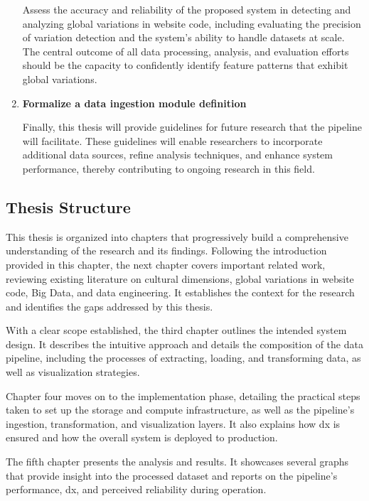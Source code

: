 \begin{enumerate}
    Assess the accuracy and reliability of the proposed system in detecting and analyzing global variations in website code, including evaluating the precision of variation detection and the system's ability to handle datasets at scale.
    The central outcome of all data processing, analysis, and evaluation efforts should be the capacity to confidently identify feature patterns that exhibit global variations.

    \item \textbf{Formalize a data ingestion module definition}

    Finally, this thesis will provide guidelines for future research that the pipeline will facilitate.
    These guidelines will enable researchers to incorporate additional data sources, refine analysis techniques, and enhance system performance, thereby contributing to ongoing research in this field.
\end{enumerate}

\subsection{Thesis Structure}
\label{sec:intro-thesis-structure}

This thesis is organized into chapters that progressively build a comprehensive understanding of the research and its findings.
Following the introduction provided in this chapter, the next chapter covers important related work, reviewing existing literature on cultural dimensions, global variations in website code, Big Data, and data engineering.
It establishes the context for the research and identifies the gaps addressed by this thesis.

With a clear scope established, the third chapter outlines the intended system design.
It describes the intuitive approach and details the composition of the data pipeline, including the processes of extracting, loading, and transforming data, as well as visualization strategies.

Chapter four moves on to the implementation phase, detailing the practical steps taken to set up the storage and compute infrastructure, as well as the pipeline's ingestion, transformation, and visualization layers.
It also explains how \ac{dx} is ensured and how the overall system is deployed to production.

The fifth chapter presents the analysis and results.
It showcases several graphs that provide insight into the processed dataset and reports on the pipeline's performance, \ac{dx}, and perceived reliability during operation.

